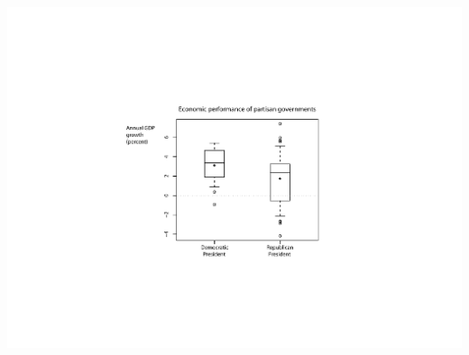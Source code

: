 \documentclass[pdflatex,landscape,titlepage]{foils}
\begin{document}
\begin{center}
\color{black}
\includegraphics[width=9 in]{gdpbox1}
\color{white}
\end{center}
\end{document}
